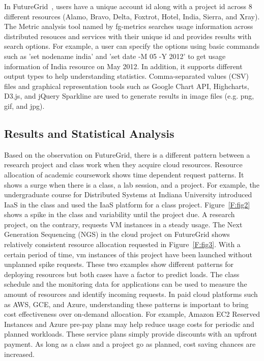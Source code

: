 \documentclass{sig-alternate-05-2015}
\begin{document}
In FutureGrid~\cite{las2010gce,las12fg-bookchapter}, users have a unique account id along with a project id across 8 different resources (Alamo, Bravo, Delta, Foxtrot, Hotel, India, Sierra, and Xray). The Metric analysis tool named by fg-metrics searches usage information across distributed resouces and services with their unique id and provides results with search options. For example, a user can specify the options using basic commands such as 'set nodename india' and 'set date -M 05 -Y 2012' to get usage information of India resource on May 2012. In addition, it supports different output types to help understanding statistics. Comma-separated values (CSV) files and graphical representation tools such as Google Chart API, Highcharts, D3.js, and jQuery Sparkline are used to generate results in image files (e.g. png, gif, and jpg).

\subsection{Results and Statistical Analysis} \label{S:result}

Based on the observation on FutureGrid, there is a different pattern between a research project and class work when they acquire cloud resources. Resource allocation of academic coursework shows time dependent request patterns. It shows a surge when there is a class, a lab session, and a project. For example, the undergraduate course for Distributed Systems at Indiana University introduced IaaS in the class and used the IaaS platform for a class project. Figure~\ref{F:fig2} shows a spike in the class and variability until the project due. A research project, on the contrary, requests VM instances in a steady usage. The Next Generation Sequencing (NGS) in the cloud project on FutureGrid shows relatively consistent resource allocation requested in Figure~\ref{F:fig3}. With a certain period of time, vm instances of this project have been launched without unplanned spike requests. These two examples show different patterns for deploying resources but both cases have a factor to predict loads. The class schedule and the monitoring data for applications can be used to measure the amount of resources and identify incoming requests. In paid cloud platforms such as AWS, GCE, and Azure, understanding these patterns is important to bring cost effectiveness over on-demand allocation. For example, Amazon EC2 Reserved Instances and Azure pre-pay plans may help reduce usage costs for periodic and planned workloads. These service plans simply provide discounts with an upfront payment. As long as a class and a project go as planned, cost saving chances are increased.
\end{document}
